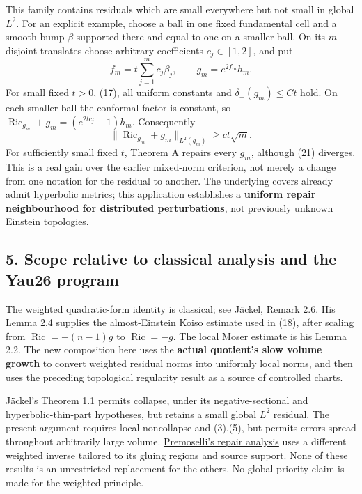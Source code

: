 \documentclass[
  11pt,
]{article}
\begin{document}
This family contains residuals which are small everywhere but not small
in global \(L^2\). For an explicit example, choose a ball in one fixed
fundamental cell and a smooth bump \(\beta\) supported there and equal
to one on a smaller ball. On its \(m\) disjoint translates choose
arbitrary coefficients \(c_j\in[1,2]\), and put \[
 f_m=t\sum_{j=1}^m c_j\beta_j,\qquad g_m=e^{2f_m}h_m.          \tag{20}
\] For small fixed \(t>0\), (17), all uniform constants and
\(\delta_-(g_m)\le C t\) hold. On each smaller ball the conformal factor
is constant, so \(\operatorname{Ric}_{g_m}+g_m =(e^{2tc_j}-1)h_m\).
Consequently \[
 \|\operatorname{Ric}_{g_m}+g_m\|_{L^2(g_m)}
                           \ge c t\sqrt m.                  \tag{21}
\] For sufficiently small fixed \(t\), Theorem A repairs every \(g_m\),
although (21) diverges. This is a real gain over the earlier mixed-norm
criterion, not merely a change from one notation for the residual to
another. The underlying covers already admit hyperbolic metrics; this
application establishes a \textbf{uniform repair neighbourhood for
distributed perturbations}, not previously unknown Einstein topologies.

\hypertarget{scope-relative-to-classical-analysis-and-the-yau26-program}{%
\subsection{5. Scope relative to classical analysis and the Yau26
program}\label{scope-relative-to-classical-analysis-and-the-yau26-program}}

The weighted quadratic-form identity is classical; see
\href{https://arxiv.org/html/2502.16692v2}{Jäckel, Remark 2.6}. His
Lemma 2.4 supplies the almost-Einstein Koiso estimate used in (18),
after scaling from \(\operatorname{Ric}=-(n-1)g\) to
\(\operatorname{Ric}=-g\). The local Moser estimate is his Lemma 2.2.
The new composition here uses the \textbf{actual quotient's slow volume
growth} to convert weighted residual norms into uniformly local norms,
and then uses the preceding topological regularity result as a source of
controlled charts.

Jäckel's Theorem 1.1 permits collapse, under its negative-sectional and
hyperbolic-thin-part hypotheses, but retains a small global \(L^2\)
residual. The present argument requires local noncollapse and (3),(5),
but permits errors spread throughout arbitrarily large volume.
\href{https://numdam.org/item/10.5802/tsg.367.pdf}{Premoselli's repair
analysis} uses a different weighted inverse tailored to its gluing
regions and source support. None of these results is an unrestricted
replacement for the others. No global-priority claim is made for the
weighted principle.
\end{document}
